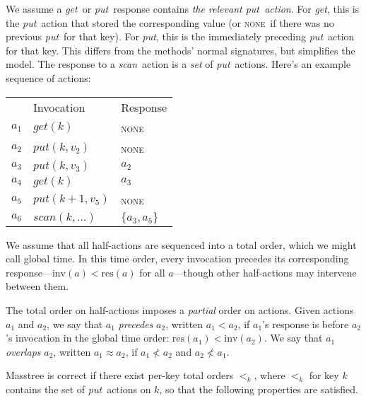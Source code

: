\documentclass[11pt]{article}
\newcommand{\NONE}{\textsc{none}}
\newcommand{\sysget}{\textit{get}}
\newcommand{\sysput}{\textit{put}}
\newcommand{\sysscan}{\textit{scan}}
\newcommand{\Inv}[1]{\ensuremath{\textrm{inv}(#1)}}
\newcommand{\Res}[1]{\ensuremath{\textrm{res}(#1)}}
\newcommand{\Precedes}{<}
\newcommand{\NotPrecedes}{\not <}
\newcommand{\Overlaps}{\approx}
\newcommand{\PrecedesK}[1]{\ensuremath{\mathrel{<_{#1}}}}
\begin{document}
We assume a \sysget\ or \sysput\ response contains \emph{the
relevant \sysput\ action}. For \sysget, this is the \sysput\ action that
stored the corresponding value (or \NONE\ if there was no previous
\sysput\ for that key). For \sysput, this is the immediately preceding
\sysput\ action for that key. This differs from the methods' normal
signatures, but simplifies the model. The response to a \sysscan\ action
is a \emph{set} of \sysput\ actions. Here's an example sequence of
actions:

\begin{flushleft}
\begin{tabular}{@{}rll}
& Invocation & Response \\
$a_1$ & $\sysget(k)$ & \NONE \\
$a_2$ & $\sysput(k, v_2)$ & \NONE \\
$a_3$ & $\sysput(k, v_3)$ & $a_2$ \\
$a_4$ & $\sysget(k)$ & $a_3$ \\
$a_5$ & $\sysput(k+1, v_5)$ & \NONE \\
$a_6$ & $\sysscan(k, \dots)$ & $\{a_3,a_5\}$ \\
\end{tabular}
\end{flushleft}

We assume that all half-actions are sequenced into a total order, which
we might call global time. In this time order, every invocation precedes
its corresponding response---$\Inv{a} < \Res{a}$ for all
$a$---though other half-actions may intervene between them.

The total order on half-actions imposes a \emph{partial} order on
actions. Given actions $a_1$ and $a_2$, we say that $a_1$
\emph{precedes} $a_2$, written $a_1 \Precedes a_2$, if $a_1$'s
response is before $a_2$'s invocation in the global time order:
$\Res{a_1} < \Inv{a_2}$. We say that $a_1$ \emph{overlaps} $a_2$,
written $a_1 \Overlaps a_2$, if $a_1 \NotPrecedes a_2$ and $a_2
\NotPrecedes a_1$.

Masstree is correct if there exist per-key total orders
\(\PrecedesK{k}\), where \(\PrecedesK{k}\) for key $k$ contains the set
of \sysput\ actions on $k$, so that the following properties are
satisfied.
\end{document}

